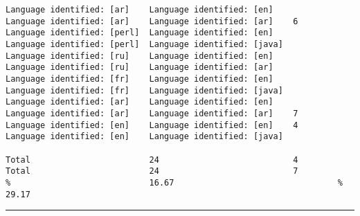 \begin{verbatim}
Language identified: [ar]    Language identified: [en]             Language identified: [ar]    Language identified: [ar]    6
Language identified: [perl]  Language identified: [en]             Language identified: [perl]  Language identified: [java]
Language identified: [ru]    Language identified: [en]             Language identified: [ru]    Language identified: [ar]
Language identified: [fr]    Language identified: [en]             Language identified: [fr]    Language identified: [java]
Language identified: [ar]    Language identified: [en]             Language identified: [ar]    Language identified: [ar]    7
Language identified: [en]    Language identified: [en]    4        Language identified: [en]    Language identified: [java]

Total                        24                           4        Total                        24                           7
%                            16.67                                 %                            29.17
\end{verbatim}
\vskip4pt\hrule

\clearpage

